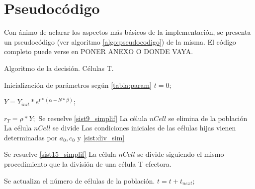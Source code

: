 \section{Pseudocódigo}

Con ánimo de aclarar los aspectos más básicos de la implementación, se presenta un pseudocódigo (ver algoritmo \ref{algo:pseudocodigo}) de la misma. El código completo puede verse en PONER ANEXO O DONDE VAYA.


\begin{algorithm}
	\caption{Algoritmo de la decisión. Células T.}
	\label{algo:pseudocodigo}
	\begin{algorithmic}[1]
		
		
		\State Inicialización de parámetros según \ref{tabla:param}
		\State $t = 0;$ 
		
		  
		\State $Y = Y_{init}*e^{t*(\alpha - N*\beta)};$ 
		
		 
			\State $ r_{T}=\rho*Y;$ 
			 
				\State Se resuelve \ref{sist9_simplif}
					\State La célula $nCell$ se elimina de la población
					\State La célula $nCell$ se divide
					\State Las condiciones iniciales de las células hijas vienen determinadas por $a_0, c_0$ y \ref{sist:div_sim}
				\EndIf
			
			 
				\State Se resuelve \ref{sist15_simplif}
					\State La célula $nCell$ se divide siguiendo el mismo procedimiento que la división de una célula T efectora. 
				\EndIf
			\EndIf
		\EndFor
		
		\State Se actualiza el número de células de la población.
		\State $t = t + t_{next};$
		
		\EndWhile
		
	\end{algorithmic}
\end{algorithm}

